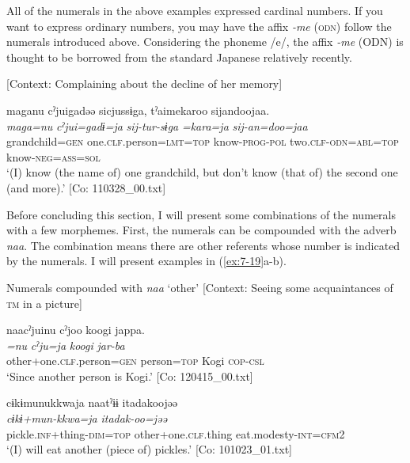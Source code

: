   All of the numerals in the above examples expressed cardinal numbers. If you want to express ordinary numbers, you may have the affix \textit{{}-me} (\textsc{odn}) follow the numerals introduced above. Considering the phoneme /e/, the affix \textit{{}-me} (ODN) is thought to be borrowed from the standard Japanese relatively recently.

\ea \label{ex:7:18}  [Context: Complaining about the decline of her memory]

{\TM}
\glll  maganu  cˀjuigadəə  sicjussɨga,   tˀaimekaroo  sijandoojaa.\\
\textit{maga=nu}  \textit{cˀjui=gadɨ=ja}  \textit{sij-tur-sɨga}  \textit{=kara=ja}  \textit{sij-an=doo=jaa}\\
grandchild=\textsc{gen}  one.\textsc{clf}.person=\textsc{lmt}=\textsc{top}  know-\textsc{prog}-\textsc{pol}            two.\textsc{clf}-\textsc{odn}=\textsc{abl}=\textsc{top}  know-\textsc{neg}=\textsc{ass}=\textsc{sol}\\
\glt ‘(I) know (the name of) one grandchild, but don’t know (that of) the second one (and more).’ [Co: 110328\_00.txt]

\z

Before concluding this section, I will present some combinations of the numerals with a few morphemes. First, the numerals can be compounded with the adverb \textit{naa}. The combination means there are other referents whose number is indicated by the numerals. I will present examples in (\ref{ex:7-19}a-b).

\ea \label{ex:7:19}  Numerals compounded with \textit{naa} ‘other’
\ea \label{ex:7:19a}[Context: Seeing some acquaintances of \textsc{tm} in a picture]

{\TM}
\glll  naacˀjuinu  cˀjoo  koogi  jappa.\\
\textit{=nu}  \textit{cˀju=ja}  \textit{koogi}  \textit{jar-ba}\\
other+one.\textsc{clf}.person=\textsc{gen}  person=\textsc{top}  Kogi  \textsc{cop}-\textsc{csl}\\
\glt ‘Since another person is Kogi.’ [Co: 120415\_00.txt]

\ex \label{ex:7:19b}
{\MY}
\glll cɨkɨmunukkwaja  naatˀɨɨ  {\textbar}itadak{\textbar}oojəə\\
      \textit{cɨkɨ+mun-kkwa=ja}  \textit{}  \textit{itadak-oo=jəə}\\
      pickle.\textsc{inf}+thing-\textsc{dim}=\textsc{top}  other+one.\textsc{clf}.thing  eat.modesty-\textsc{int}=\textsc{cfm}2\\
\glt    ‘(I) will eat another (piece of) pickles.’       [Co: 101023\_01.txt]

